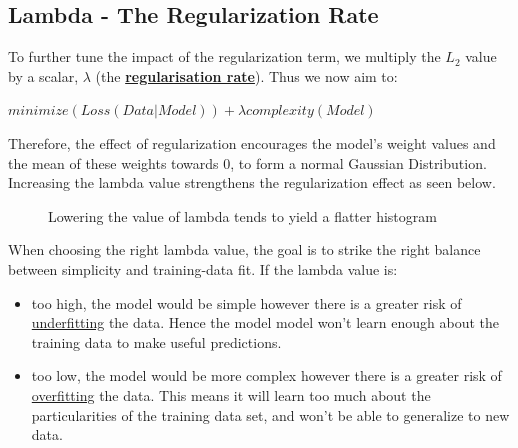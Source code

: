 \documentclass[12pt]{article}
\begin{document}
\subsection{Lambda - The Regularization Rate}
To further tune the impact of the regularization term, we multiply the $L_2$ value by a scalar, $\lambda$ (the \href{https://developers.google.com/machine-learning/glossary#regularization_rate}{\textbf{regularisation rate}}). Thus we now aim to: 
\begin{center}
$minimize(Loss(Data|Model)) + \lambda complexity(Model)$
\end{center}
Therefore, the effect of regularization encourages the model's weight values and the mean of these weights towards 0, to form a normal Gaussian Distribution. Increasing the lambda value strengthens the regularization effect as seen below.
\begin{figure}[H]%
    \centering
    \qquad
    \caption{Lowering the value of lambda tends to yield a flatter histogram}%
\end{figure}
When choosing the right lambda value, the goal is to strike the right balance between simplicity and training-data fit. If the lambda value is:
\begin{itemize}
\item too high, the model would be simple however there is a greater risk of \underline{underfitting} the data. Hence the model model won't learn enough about the training data to make useful predictions.
\item too low, the model would be more complex however there is a greater risk of \underline{overfitting} the data. This means it will learn too much about the particularities of the training data set, and won't be able to generalize to new data.
\end{itemize}
\end{document}
